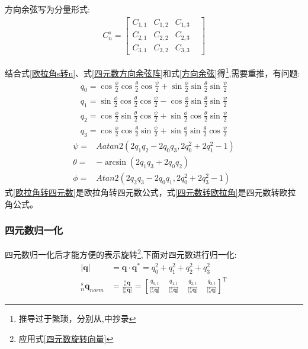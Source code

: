 方向余弦写为分量形式:
\begin{equation}\label{方向余弦}
    \begin{split} 
        C^s_n = \left[\begin{matrix} 
                C_{1,1} & C_{1,2} & C_{1,3} & \\
                C_{2,1} & C_{2,2} & C_{2,3} & \\
                C_{3,1} & C_{3,2} & C_{3,3} &
        \end{matrix}\right]
    \end{split}
\end{equation} 

结合式\ref{欧拉角s转n}、式\ref{四元数方向余弦阵}和式\ref{方向余弦}得\footnote{推导过于繁琐，分别从\citep{捷联惯导航},\citep{9轴融合论文}中抄录},需要重推，有问题:
\begin{equation}\label{欧拉角转四元数}
    \begin{split} 
        q_0=\cos\frac{\phi}{2}\cos\frac{\theta}{2}\cos\frac{\psi}{2}+\sin\frac{\phi}{2}\sin\frac{\theta}{2}\sin\frac{\psi}{2} \\
        q_1=\sin\frac{\phi}{2}\cos\frac{\theta}{2}\cos\frac{\psi}{2}-\cos\frac{\phi}{2}\sin\frac{\theta}{2}\sin\frac{\psi}{2} \\
        q_2=\cos\frac{\phi}{2}\sin\frac{\theta}{2}\cos\frac{\psi}{2}+\sin\frac{\phi}{2}\cos\frac{\theta}{2}\sin\frac{\psi}{2} \\
        q_3=\cos\frac{\phi}{2}\cos\frac{\theta}{2}\sin\frac{\psi}{2}+\sin\frac{\phi}{2}\sin\frac{\theta}{2}\cos\frac{\psi}{2}
    \end{split}
\end{equation} 
\begin{equation}\label{四元数转欧拉角}
    \begin{split} 
        \psi=&Aatan2(2q_1q_2-2q_0q_3,2q^2_0+2q^2_1-1) \\
        \theta=&-\arcsin(2q_1q_3+2q_0q_2) \\
        \phi=&Atan2(2q_2q_3-2q_0q_1,2q^2_0+2q^2_3-1)
    \end{split}
\end{equation} 
式\ref{欧拉角转四元数}是欧拉角转四元数公式，式\ref{四元数转欧拉角}是四元数转欧拉角公式。

\subsubsection{四元数归一化}
四元数归一化\citep{四元数矢量旋转证明1,四元数矢量旋转证明2}后才能方便的表示旋转\footnote{应用式\ref{四元数旋转向量}},下面对四元数进行归一化:
\begin{equation}\label{四元数归一化}
    \begin{split}
        |\bm{q}|&=\bm{q} \cdot \bm{q}^*={q_0^2+q_1^2+q_2^2+q_3^2}\\ 
        ^s_n\bm{q}_{norm}&=\frac{^s_n\bm{q}}{|^s_n\bm{q}|}
        =\left[\frac{q_{0,t}}{|^s_n\bm{q}|}\quad
            \frac{q_{1,t}}{|^s_n\bm{q}|}\quad
            \frac{q_{2,t}}{|^s_n\bm{q}|}\quad
             \frac{q_{3,t}}{|^s_n\bm{q}|}\right]^\mathrm{T}
    \end{split}
\end{equation} 

